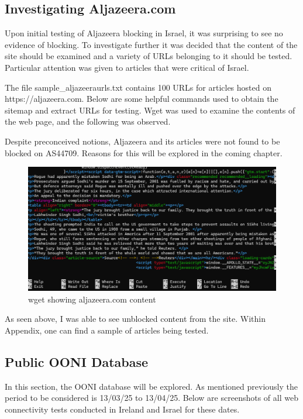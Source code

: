 \subsection{Investigating Aljazeera.com}
Upon initial testing of Aljazeera blocking in Israel, it was surprising to see no evidence of blocking. To investigate further it was decided that the content of the site should be examined and a variety of URLs belonging to it should be tested. Particular attention was given to articles that were critical of Israel.

The file sample\_aljazeeraurls.txt contains 100 URLs for articles hosted on https://aljazeera.com. Below are some helpful commands used to obtain the sitemap and extract URLs for testing. Wget was used to examine the contents of the web page, and the following was observed.

Despite preconceived notions, Aljazeera and its articles were not found to be blocked on AS44709. Reasons for this will be explored in the coming chapter.

\begin{figure} [H]
    \centering
    \includegraphics[width=1\linewidth]{wgetAljazeera.png}
    \caption{wget showing aljazeera.com content}
    \label{fig:enter-label}
\end{figure}


As seen above, I was able to see unblocked content from the site. Within Appendix, one can find a sample of articles being tested. 

\subsection{Public OONI Database}
In this section, the OONI database will be explored. As mentioned previously the period to be considered is 13/03/25 to 13/04/25. Below are screenshots of all web connectivity tests conducted in Ireland and Israel for these dates. 

